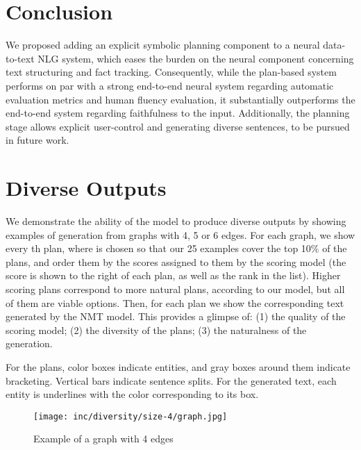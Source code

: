 \documentclass[11pt,a4paper]{article}
\begin{document}
\section{Conclusion}
We proposed adding an explicit symbolic planning component to a neural data-to-text NLG system, which eases the burden on the neural component concerning text structuring and fact tracking. Consequently, while the plan-based system performs on par with a strong end-to-end neural system regarding automatic evaluation metrics and human fluency evaluation, it substantially outperforms the end-to-end system regarding faithfulness to the input. Additionally, the planning stage allows explicit user-control and generating diverse sentences, to be pursued in future work.


\clearpage

\appendix
\appendixpage
\addappheadtotoc
\section{Diverse Outputs}

We demonstrate the ability of the model to produce diverse outputs by showing examples of generation from graphs with 4, 5 or 6 edges. For each graph, we show every th plan, where  is chosen so that our 25 examples cover the top 10\% of the plans, and order them by the scores assigned to them by the scoring model (the score is shown to the right of each plan, as well as the rank in the list). Higher scoring plans correspond to more natural plans, according to our model, but all of them are viable options. Then, for each plan we show the corresponding text generated by the NMT model. This provides a glimpse of: (1) the quality of the scoring model; (2) the diversity of the plans; (3) the naturalness of the generation.

For the plans, color boxes indicate entities, and gray boxes around them indicate bracketing. Vertical bars indicate sentence splits.
For the generated text, each entity is underlines with the color corresponding to its box.







\begin{figure*}[!hb]
    \centering
    \texttt{[image: inc/diversity/size-4/graph.jpg]}
    \caption{Example of a graph with 4 edges}
    \label{fig:diversity:size-4:graph}
\end{figure*}
\end{document}
